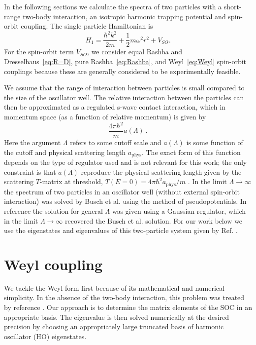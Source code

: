 \documentclass[%
 notitlepage,
 preprint,
showpacs,%
 amsmath,amssymb,
 aps,
pra,
]{revtex4-1}
\begin{document}
In the following sections we calculate the spectra of two particles with a short-range two-body interaction, an isotropic harmonic trapping potential and spin-orbit coupling. The single particle Hamiltonian is 
\begin{equation}\label{eq:shortRangeInteraction}
H_1=\frac{\hbar^2 k^2}{2m}+\frac{1}{2}m\omega^2 r^2 + V_{SO}.
\end{equation}
For the spin-orbit term $V_{SO}$, we consider equal Rashba and Dresselhaus~\eqref{eq:R=D}, pure Rashba~\eqref{eq:Rashba}, and Weyl~\eqref{eq:Weyl} spin-orbit couplings  because these are generally considered to be experimentally feasible.

We assume that the range of interaction between particles is small compared to the size of the oscillator well.  The relative interaction between the particles can then be approximated as a regulated s-wave contact interaction, which in momentum space (as a function of relative momentum) is given by
\begin{equation}
\frac{4\pi \hbar^2}{m}a(\Lambda)\ .
\end{equation}
Here the argument $\Lambda$ refers to some cutoff scale and $a(\Lambda)$ is some function of the cutoff and physical scattering length $a_{\text{phys}}$.  The exact form of this function depends on the type of regulator used and is not relevant for this work; the only constraint is that $a(\Lambda)$ reproduce the physical scattering length given by the scattering $T$-matrix at threshold, $T(E=0)=4\pi\hbar^2 a_{\text{phys}}/m$ \cite{taylor2000}. In the limit $\Lambda\rightarrow \infty$ the spectrum of two particles in an oscillator well (without external spin-orbit interaction) was solved by Busch et al. \cite{Busch} using the method of pseudopotentials.  In reference  \cite{Luu:2006xv} the solution for general $\Lambda$ was given using a Gaussian regulator, which in the limit $\Lambda\rightarrow\infty$ recovered the Busch et al. solution.  For our work below we use the eigenstates and eigenvalues of this two-particle system given by Ref. \cite{Busch}.

\section{\label{sec:Weyl}Weyl coupling}
We tackle the Weyl form first because of its mathematical and numerical simplicity. In the absence of the two-body interaction, this problem was treated by reference \cite{0953-4075-46-13-134003}. Our approach is to determine the matrix elements of the SOC in an appropriate basis. The eigenvalue is then solved numerically at the desired precision by choosing an appropriately large truncated basis of harmonic oscillator (HO) eigenstates.
\end{document}
